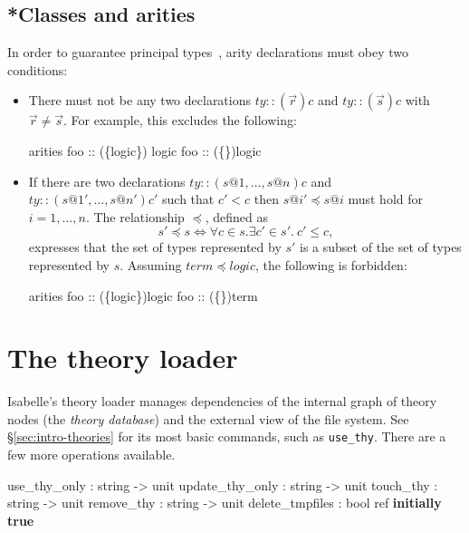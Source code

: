 \subsection{*Classes and arities}

In order to guarantee principal types~\cite{nipkow-prehofer},
arity declarations must obey two conditions:
\begin{itemize}
\item There must not be any two declarations $ty :: (\vec{r})c$ and
  $ty :: (\vec{s})c$ with $\vec{r} \neq \vec{s}$.  For example, this
  excludes the following:
\begin{ttbox}
arities
  foo :: (\{logic{\}}) logic
  foo :: (\{{\}})logic
\end{ttbox}

\item If there are two declarations $ty :: (s@1,\dots,s@n)c$ and $ty ::
  (s@1',\dots,s@n')c'$ such that $c' < c$ then $s@i' \preceq s@i$ must hold
  for $i=1,\dots,n$.  The relationship $\preceq$, defined as
\[ s' \preceq s \iff \forall c\in s. \exists c'\in s'.~ c'\le c, \]
expresses that the set of types represented by $s'$ is a subset of the
set of types represented by $s$.  Assuming $term \preceq logic$, the
following is forbidden:
\begin{ttbox}
arities
  foo :: (\{logic{\}})logic
  foo :: (\{{\}})term
\end{ttbox}

\end{itemize}


\section{The theory loader}\label{sec:more-theories}

Isabelle's theory loader manages dependencies of the internal graph of theory
nodes (the \emph{theory database}) and the external view of the file system.
See \S\ref{sec:intro-theories} for its most basic commands, such as
\texttt{use_thy}.  There are a few more operations available.

\begin{ttbox}
use_thy_only    : string -> unit
update_thy_only : string -> unit
touch_thy       : string -> unit
remove_thy      : string -> unit
delete_tmpfiles : bool ref \hfill\textbf{initially true}
\end{ttbox}

